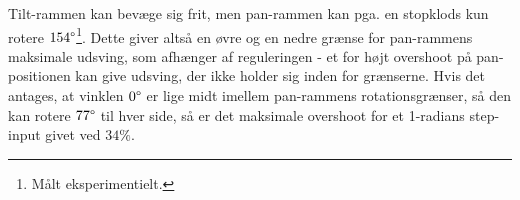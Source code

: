 Tilt-rammen kan bevæge sig frit,
men pan-rammen kan pga. en stopklods kun rotere \(154 \degree\)\footnote{Målt eksperimentielt.}.
Dette giver altså en øvre og en nedre grænse for pan-rammens maksimale udsving,
som afhænger af reguleringen
- et for højt overshoot på pan-positionen kan give udsving, der ikke holder sig inden for grænserne.
Hvis det antages, at vinklen \(0 \degree\) er lige midt imellem pan-rammens rotationsgrænser,
så den kan rotere \(77 \degree\) til hver side, så er det maksimale overshoot for et 1-radians step-input
givet ved \(34 \%\).

